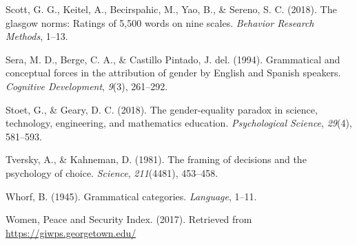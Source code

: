 \documentclass[man]{apa6}
\theoremstyle{definition}
\theoremstyle{definition}
\theoremstyle{definition}
\theoremstyle{remark}
\begin{document}
\hypertarget{ref-scott2018glasgow}{}
Scott, G. G., Keitel, A., Becirspahic, M., Yao, B., \& Sereno, S. C.
(2018). The glasgow norms: Ratings of 5,500 words on nine scales.
\emph{Behavior Research Methods}, 1--13.

\hypertarget{ref-sera1994grammatical}{}
Sera, M. D., Berge, C. A., \& Castillo Pintado, J. del. (1994).
Grammatical and conceptual forces in the attribution of gender by
English and Spanish speakers. \emph{Cognitive Development}, \emph{9}(3),
261--292.

\hypertarget{ref-stoet2018gender}{}
Stoet, G., \& Geary, D. C. (2018). The gender-equality paradox in
science, technology, engineering, and mathematics education.
\emph{Psychological Science}, \emph{29}(4), 581--593.

\hypertarget{ref-tversky1981framing}{}
Tversky, A., \& Kahneman, D. (1981). The framing of decisions and the
psychology of choice. \emph{Science}, \emph{211}(4481), 453--458.

\hypertarget{ref-whorf1945grammatical}{}
Whorf, B. (1945). Grammatical categories. \emph{Language}, 1--11.

\hypertarget{ref-wps}{}
Women, Peace and Security Index. (2017). Retrieved from
\url{https://giwps.georgetown.edu/}

\endgroup
\end{document}

